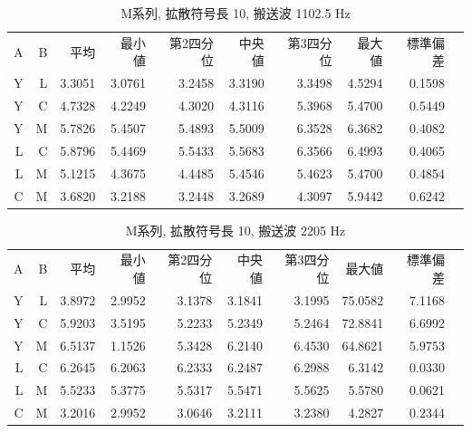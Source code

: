 \begin{table}[p]\centering
  \caption{M系列, 拡散符号長 10, 搬送波 1102.5 Hz}
  \label{tab:hikaku15}
  \begin{tabular}{rrrrrrrrrr}
    \hline
     A & B & 平均 & 最小値 & 第2四分位 & 中央値 & 第3四分位 & 最大値 & 標準偏差 \\
     Y & L & 3.3051 & 3.0761 & 3.2458 & 3.3190 & 3.3498 & 4.5294 & 0.1598 \\
     Y & C & 4.7328 & 4.2249 & 4.3020 & 4.3116 & 5.3968 & 5.4700 & 0.5449 \\
     Y & M & 5.7826 & 5.4507 & 5.4893 & 5.5009 & 6.3528 & 6.3682 & 0.4082 \\
     L & C & 5.8796 & 5.4469 & 5.5433 & 5.5683 & 6.3566 & 6.4993 & 0.4065 \\
     L & M & 5.1215 & 4.3675 & 4.4485 & 5.4546 & 5.4623 & 5.4700 & 0.4854 \\
     C & M & 3.6820 & 3.2188 & 3.2448 & 3.2689 & 4.3097 & 5.9442 & 0.6242 \\
    \hline
  \end{tabular}
\end{table}

\begin{table}[p]\centering
  \caption{M系列, 拡散符号長 10, 搬送波 2205 Hz}
  \label{tab:hikaku16}
  \begin{tabular}{rrrrrrrrrr}
    \hline
     A & B & 平均 & 最小値 & 第2四分位 & 中央値 & 第3四分位 & 最大値 & 標準偏差 \\
     Y & L & 3.8972 & 2.9952 & 3.1378 & 3.1841 & 3.1995 & 75.0582 & 7.1168 \\
     Y & C & 5.9203 & 3.5195 & 5.2233 & 5.2349 & 5.2464 & 72.8841 & 6.6992 \\
     Y & M & 6.5137 & 1.1526 & 5.3428 & 6.2140 & 6.4530 & 64.8621 & 5.9753 \\
     L & C & 6.2645 & 6.2063 & 6.2333 & 6.2487 & 6.2988 & 6.3142 & 0.0330 \\
     L & M & 5.5233 & 5.3775 & 5.5317 & 5.5471 & 5.5625 & 5.5780 & 0.0621 \\
     C & M & 3.2016 & 2.9952 & 3.0646 & 3.2111 & 3.2380 & 4.2827 & 0.2344 \\
    \hline
  \end{tabular}
\end{table}

